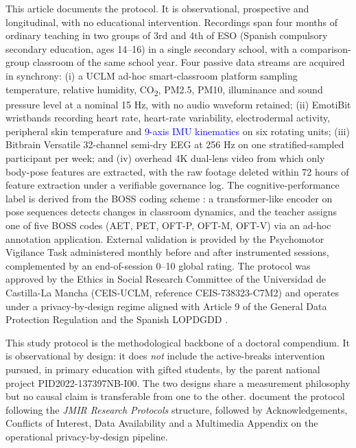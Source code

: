 This article documents the protocol. It is observational, prospective and longitudinal, with no educational intervention. Recordings span four months of ordinary teaching in two groups of 3rd and 4th of ESO (Spanish compulsory secondary education, ages 14--16) in a single secondary school, with a comparison-group classroom of the same school year. Four passive data streams are acquired in synchrony: (i) a UCLM ad-hoc smart-classroom platform sampling temperature, relative humidity, CO\textsubscript{2}, PM2.5, PM10, illuminance and sound pressure level at a nominal 15 Hz, with no audio waveform retained; (ii) EmotiBit wristbands recording heart rate, heart-rate variability, electrodermal activity, peripheral skin temperature and \textcolor{blue}{9-axis IMU kinematics} on six rotating units; (iii) Bitbrain Versatile 32-channel semi-dry EEG at 256 Hz on one stratified-sampled participant per week; and (iv) overhead 4K dual-lens video from which only body-pose features are extracted, with the raw footage deleted within 72 hours of feature extraction under a verifiable governance log. The cognitive-performance label is derived from the BOSS coding scheme \parencite{Shapiro2011_boss}: a transformer-like encoder on pose sequences detects changes in classroom dynamics, and the teacher assigns one of five BOSS codes (AET, PET, OFT-P, OFT-M, OFT-V) via an ad-hoc annotation application. External validation is provided by the Psychomotor Vigilance Task administered monthly before and after instrumented sessions, complemented by an end-of-session 0--10 global rating. The protocol was approved by the Ethics in Social Research Committee of the Universidad de Castilla-La Mancha (CEIS-UCLM, reference CEIS-738323-C7M2) and operates under a privacy-by-design regime aligned with Article 9 of the General Data Protection Regulation and the Spanish LOPDGDD \parencite{Macenaite2017_minors_gdpr,EDPB2020_consent}.

This study protocol is the methodological backbone of a doctoral compendium. It is observational by design: it does \emph{not} include the active-breaks intervention pursued, in primary education with gifted students, by the parent national project PID2022-137397NB-I00. The two designs share a measurement philosophy but no causal claim is transferable from one to the other.  document the protocol following the \emph{JMIR Research Protocols} structure, followed by Acknowledgements, Conflicts of Interest, Data Availability and a Multimedia Appendix on the operational privacy-by-design pipeline.
